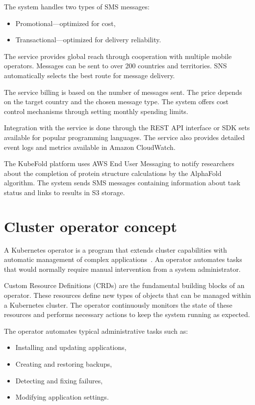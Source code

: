 The system handles two types of SMS messages:
\begin{itemize}
    \item Promotional—optimized for cost,
    \item Transactional—optimized for delivery reliability.
\end{itemize}

The service provides global reach through cooperation with multiple mobile operators.
Messages can be sent to over 200 countries and territories.
SNS automatically selects the best route for message delivery.

The service billing is based on the number of messages sent.
The price depends on the target country and the chosen message type.
The system offers cost control mechanisms through setting monthly spending limits.

Integration with the service is done through the REST API interface or SDK sets available for popular programming languages.
The service also provides detailed event logs and metrics available in Amazon CloudWatch.

The KubeFold platform uses AWS End User Messaging to notify researchers about the completion of protein structure calculations by the AlphaFold algorithm.
The system sends SMS messages containing information about task status and links to results in S3 storage.


\section{Cluster operator concept}

A Kubernetes operator is a program that extends cluster capabilities with automatic management of complex applications~\cite{k8s_operators}.
An operator automates tasks that would normally require manual intervention from a system administrator.

Custom Resource Definitions (CRDs) are the fundamental building blocks of an operator.
These resources define new types of objects that can be managed within a Kubernetes cluster.
The operator continuously monitors the state of these resources and performs necessary actions to keep the system running as expected.

The operator automates typical administrative tasks such as:
\begin{itemize}
    \item Installing and updating applications,
    \item Creating and restoring backups,
    \item Detecting and fixing failures,
    \item Modifying application settings.
\end{itemize}

